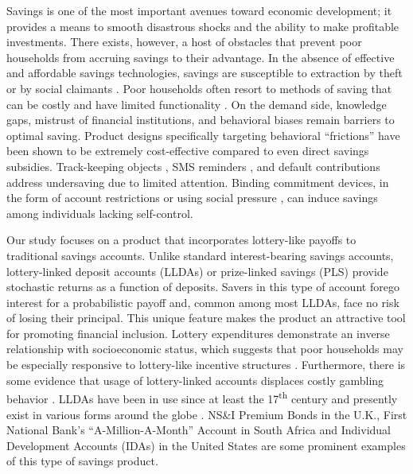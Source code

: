 \documentclass[12pt]{article}
\begin{document}
	Savings is one of the most important avenues toward economic development; it provides a means to smooth disastrous shocks and the ability to make profitable investments. There exists, however, a host of obstacles that prevent poor households from accruing savings to their advantage. In the absence of effective and affordable savings technologies, savings are susceptible to extraction by theft or by social claimants . Poor households often resort to methods of saving that can be costly and have limited functionality . On the demand side, knowledge gaps, mistrust of financial institutions, and behavioral biases remain barriers to optimal saving. Product designs specifically targeting behavioral ``frictions'' have been shown to be extremely cost-effective compared to even direct savings subsidies. Track-keeping objects , SMS reminders , and default contributions  address undersaving due to limited attention. Binding commitment devices, in the form of account restrictions  or using social pressure , can induce savings among individuals lacking self-control.

	Our study focuses on a product that incorporates lottery-like payoffs to traditional savings accounts. Unlike standard interest-bearing savings accounts, lottery-linked deposit accounts (LLDAs) or prize-linked savings (PLS) provide stochastic returns as a function of deposits. Savers in this type of account forego interest for a probabilistic payoff and, common among most LLDAs, face no risk of losing their principal. This unique feature makes the product an attractive tool for promoting financial inclusion. Lottery expenditures demonstrate an inverse relationship with socioeconomic status, which suggests that poor households may be especially responsive to lottery-like incentive structures . Furthermore, there is some evidence that usage of lottery-linked accounts displaces costly gambling behavior . LLDAs have been in use since at least the 17\textsuperscript{th} century and presently exist in various forms around the globe . NS\&I Premium Bonds in the U.K., First National Bank's ``A-Million-A-Month'' Account in South Africa and Individual Development Accounts (IDAs) in the United States are some prominent examples of this type of savings product.
\end{document}
